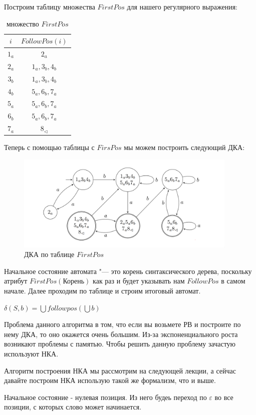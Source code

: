Построим таблицу множества $FirstPos$ для нашего регулярного выражения:
\begin{table}[h!]
    \centering
    \begin{tabular}{c|c}
        $i$   & $FollowPos(i)$ \\ \hline
        $1_a$ & $2_a$          \\
        $2_a$ & $1_a,3_b,4_b$  \\
        $3_b$ & $1_a,3_b,4_b$  \\
        $4_b$ & $5_a,6_b,7_a$  \\
        $5_a$ & $5_a,6_b,7_a$  \\
        $6_b$ & $5_a,6_b,7_a$  \\
        $7_a$ & $8_{\lhd}$
    \end{tabular}
    \caption{множество $FirstPos$}
\end{table}

Теперь с помощью таблицы с $FirsPos$ мы можем построить следующий ДКА:
\begin{figure}[ht!p]
    \centering
    \includegraphics[width = 400px]{images/ДКА.PNG}
    \caption{ДКА по таблице $FirstPos$}
    \label{fig:DFA}
\end{figure}

Начальное состояние автомата "--- это корень синтаксического дерева, поскольку атрибут $FirstPos(\text{Корень})$ как раз и будет указывать нам $FollowPos$ в самом начале. Далее проходим по таблице и строим итоговый автомат.


$\delta(S,b) = \bigcup followpos(\bigcup b)$

Проблема данного алгоритма в том, что если вы возьмете РВ и построите по нему ДКА, то оно окажется очень большим. Из-за экспоненциального роста возникают проблемы с памятью. Чтобы решить данную проблему зачастую используют НКА.

Алгоритм построения НКА мы рассмотрим на следующей лекции, а сейчас давайте построим НКА использую такой же  формализм, что и выше.

Начальное состояние - нулевая позиция. Из него будеь переход по $\varepsilon$ во все позиции, с которых слово может начинается.

